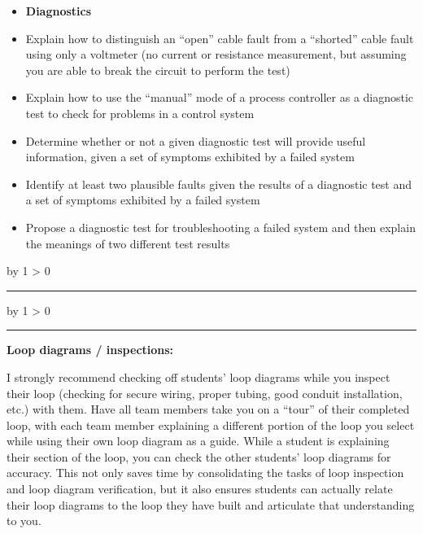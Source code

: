 \documentclass[12pt,a4paper]{article}
\def\svar{
           \advance\answnum by 1
           \ifnum \answnum > 0
                \hrule
                \vskip 3pt
                \leftline{Svar \the\answnum}
                \vskip 3pt \fi}
\def\notes{
           \advance\explnum by 1
           \ifnum \explnum > 0
                \hrule
                \vskip 3pt
                \leftline{Notes \the\explnum}
                \vskip 3pt \fi}
\begin{document}
\filbreak

\begin{itemize}
\item{} {\bf Diagnostics}
\item{} Explain how to distinguish an ``open'' cable fault from a ``shorted'' cable fault using only a voltmeter (no current or resistance measurement, but assuming you are able to break the circuit to perform the test)
\item{} Explain how to use the ``manual'' mode of a process controller as a diagnostic test to check for problems in a control system
\item{} Determine whether or not a given diagnostic test will provide useful information, given a set of symptoms exhibited by a failed system
\item{} Identify at least two plausible faults given the results of a diagnostic test and a set of symptoms exhibited by a failed system
\item{} Propose a diagnostic test for troubleshooting a failed system and then explain the meanings of two different test results
\end{itemize}

\vskip 10pt \filbreak 





\svar{} 


\vskip 10pt \filbreak 





\notes{} 

\noindent
{\bf Loop diagrams / inspections:}

I strongly recommend checking off students' loop diagrams while you inspect their loop (checking for secure wiring, proper tubing, good conduit installation, etc.) with them.  Have all team members take you on a ``tour'' of their completed loop, with each team member explaining a different portion of the loop you select while using their own loop diagram as a guide.  While a student is explaining their section of the loop, you can check the other students' loop diagrams for accuracy.  This not only saves time by consolidating the tasks of loop inspection and loop diagram verification, but it also ensures students can actually relate their loop diagrams to the loop they have built and articulate that understanding to you.

\vskip 10pt

\goodbreak
\end{document}
